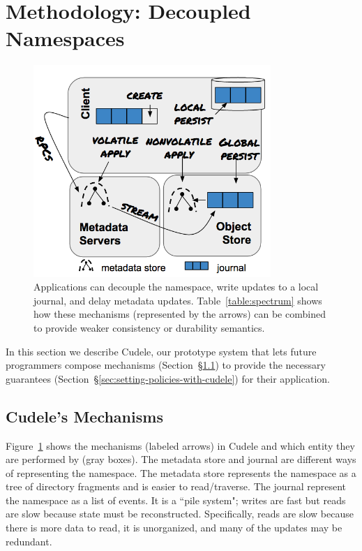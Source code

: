 \section{Methodology: Decoupled Namespaces}
\label{sec:methodology-decoupled-namespaces}

\begin{figure}[tb]
\caption{Applications can decouple the namespace, write updates to a local
journal, and delay metadata updates.  Table~\ref{table:spectrum} shows how
these mechanisms (represented by the arrows) can be combined to provide weaker
consistency or durability semantics.  }\label{fig:decouple}
\centering
\includegraphics[width=90mm]{figures/fig-decouple.png}
\end{figure}

In this section we describe Cudele, our prototype system that lets future
programmers compose mechanisms (Section~\S\ref{sec:cudeles-mechanisms}) to
provide the necessary guarantees
(Section~\S\ref{sec:setting-policies-with-cudele}) for their application.

\subsection{Cudele's Mechanisms}
\label{sec:cudeles-mechanisms}

Figure~\ref{fig:decouple} shows the mechanisms (labeled arrows) in Cudele and
which entity they are performed by (gray boxes). The metadata store and journal
are different ways of representing the namespace. The metadata store represents
the namespace as a tree of directory fragments and is easier to read/traverse.
The journal represent the namespace as a list of events. It is
a ``pile system"; writes are fast but reads are slow because state must be
reconstructed.  Specifically, reads are slow because there is more data to
read, it is unorganized, and many of the updates may be redundant.

